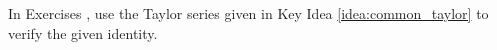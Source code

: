 {\noindent In Exercises}
{, use the Taylor series  given in Key Idea \ref{idea:common_taylor} to verify the given identity.
}

